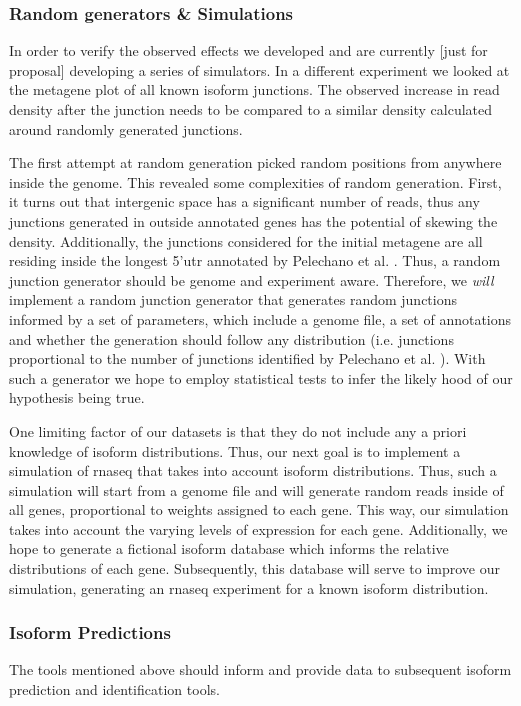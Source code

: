 \documentclass[12pt]{article}
\begin{document}
\subsubsection{Random generators \& Simulations}\label{rng}
In order to verify the observed effects we developed and are currently {\tiny [just for proposal]} developing a series of simulators. In a different experiment we looked at the metagene plot of all known isoform junctions. The observed increase in read density after the junction needs to be compared to a similar density calculated around randomly generated junctions.

The first attempt at random generation picked random positions from anywhere inside the genome. This revealed some complexities of random generation. First, it turns out that intergenic space has a significant number of reads, thus any junctions generated in outside annotated genes has the potential of skewing the density. Additionally, the junctions considered for the initial metagene are all residing inside the longest 5'\acrshort{utr} annotated by Pelechano et al. \cite{Pelechano2013}. Thus, a random junction generator should be genome and experiment aware. Therefore, we \textit{will} implement a random junction generator that generates random junctions informed by a set of parameters, which include a genome file, a set of annotations and whether the 
generation should follow any distribution (i.e. junctions proportional to the number of junctions identified by Pelechano et al. \cite{Pelechano2013}). With such a generator we hope to employ statistical tests to infer the likely hood of our hypothesis being true. 

One limiting factor of our datasets is that they do not include any a priori knowledge of isoform distributions. Thus, our next goal is to implement a simulation of \acrshort{rnaseq} that takes into account isoform distributions. Thus, such a simulation will start from a genome file and will generate random reads inside of all genes, proportional to weights assigned to each gene. This way, our simulation takes into account the varying levels of expression for each gene. Additionally, we hope to generate a fictional isoform database which informs the relative distributions of each gene. Subsequently, this database will serve to improve our simulation, generating an \acrshort{rnaseq} experiment for a known isoform distribution. 

\subsubsection{Isoform Predictions}\label{prediction}
The tools mentioned above should inform and provide data to subsequent isoform prediction and identification tools. 
\end{document}
